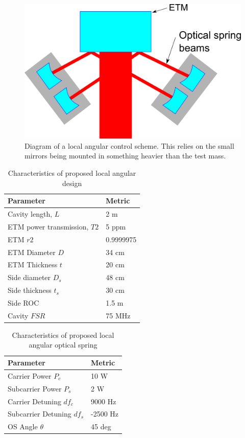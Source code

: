 \begin{figure}[htp]%
\begin{center}
\includegraphics[width=.8\textwidth]{figures/application/shortTrapDiagram}%
\caption[Local angular control]{Diagram of a local angular control scheme. This relies on the small mirrors being mounted in something heavier than the test mass.}%
\label{fig:shorttrapdiagram}%
\end{center}
\end{figure}


\begin{table}[htp]
\centering
\begin{tabular}{ l | l | }
\bf{Parameter}& \bf{Metric}  \\ \hline
Cavity length, $L$ & 2 m \\ \hline
ETM power transmission, $T2$ & 5 ppm \\ \hline
ETM $r2$ &0.9999975 \\ \hline
ETM Diameter $D$ & 34 cm \\ \hline
ETM Thickness $t$ & 20 cm \\ \hline
Side diameter $D_s$ & 48 cm \\ \hline
Side thickness $t_s$ & 30 cm \\ \hline
Side ROC & 1.5 m \\ \hline
Cavity $FSR$ & 75 MHz \\ \hline

\end{tabular}
\caption[Local angular design]{Characteristics of proposed local angular design}
\label{tab:localproposal}
\end{table}

\begin{table}[htp]
\centering
\begin{tabular}{ l | l | }
\bf{Parameter}& \bf{Metric}  \\ \hline
Carrier Power $P_c$ & 10 W \\ \hline
Subcarrier Power $P_s$ & 2 W \\ \hline
Carrier Detuning $df_c$ & 9000 Hz \\ \hline
Subcarrier Detuning $df_s$ & -2500 Hz \\ \hline
OS Angle $\theta$ & 45 deg \\ \hline
\end{tabular}
\caption[Local angular optical springs]{Characteristics of proposed local angular optical spring}
\label{tab:localos}
\end{table}

